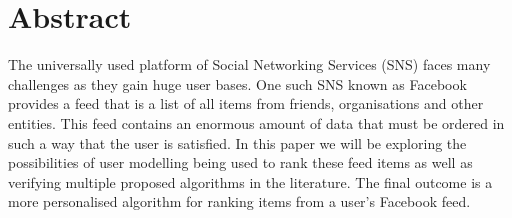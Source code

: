 \chapter*{Abstract}\label{abstract}
The universally used platform of Social Networking Services (SNS) faces many challenges as they gain huge user bases. One such SNS known as Facebook provides a feed that is a list of all items from friends, organisations and other entities. This feed contains an enormous amount of data that must be ordered in such a way that the user is satisfied. In this paper we will be exploring the possibilities of user modelling being used to rank these feed items as well as verifying multiple proposed algorithms in the literature. The final outcome is a more personalised algorithm for ranking items from a user’s Facebook feed.